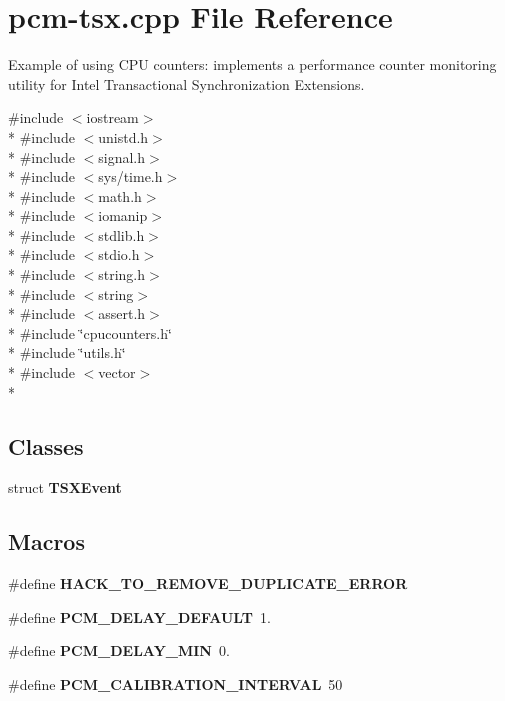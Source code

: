 \section{pcm-\/tsx.cpp File Reference}
\label{pcm-tsx_8cpp}


Example of using C\+P\+U counters\+: implements a performance counter monitoring utility for Intel Transactional Synchronization Extensions.  


{\ttfamily \#include $<$iostream$>$}\\*
{\ttfamily \#include $<$unistd.\+h$>$}\\*
{\ttfamily \#include $<$signal.\+h$>$}\\*
{\ttfamily \#include $<$sys/time.\+h$>$}\\*
{\ttfamily \#include $<$math.\+h$>$}\\*
{\ttfamily \#include $<$iomanip$>$}\\*
{\ttfamily \#include $<$stdlib.\+h$>$}\\*
{\ttfamily \#include $<$stdio.\+h$>$}\\*
{\ttfamily \#include $<$string.\+h$>$}\\*
{\ttfamily \#include $<$string$>$}\\*
{\ttfamily \#include $<$assert.\+h$>$}\\*
{\ttfamily \#include \char`\"{}cpucounters.\+h\char`\"{}}\\*
{\ttfamily \#include \char`\"{}utils.\+h\char`\"{}}\\*
{\ttfamily \#include $<$vector$>$}\\*
\subsection*{Classes}
\begin{DoxyCompactItemize}
\item 
struct {\bf T\+S\+X\+Event}
\end{DoxyCompactItemize}
\subsection*{Macros}
\begin{DoxyCompactItemize}
\item 
\#define {\bfseries H\+A\+C\+K\+\_\+\+T\+O\+\_\+\+R\+E\+M\+O\+V\+E\+\_\+\+D\+U\+P\+L\+I\+C\+A\+T\+E\+\_\+\+E\+R\+R\+O\+R}\label{pcm-tsx_8cpp_ac4eeb11d89b0f517835a12a04443ebe4}

\item 
\#define {\bfseries P\+C\+M\+\_\+\+D\+E\+L\+A\+Y\+\_\+\+D\+E\+F\+A\+U\+L\+T}~1.\label{pcm-tsx_8cpp_aa9ecc55c90c7a69729babc4f5f91ed96}

\item 
\#define {\bfseries P\+C\+M\+\_\+\+D\+E\+L\+A\+Y\+\_\+\+M\+I\+N}~0.\label{pcm-tsx_8cpp_acccbe8441d6dd75bdc949f5f0ee126c5}

\item 
\#define {\bfseries P\+C\+M\+\_\+\+C\+A\+L\+I\+B\+R\+A\+T\+I\+O\+N\+\_\+\+I\+N\+T\+E\+R\+V\+A\+L}~50\label{pcm-tsx_8cpp_a433dde946b6713059756318598c9a6fe}

\end{DoxyCompactItemize}

